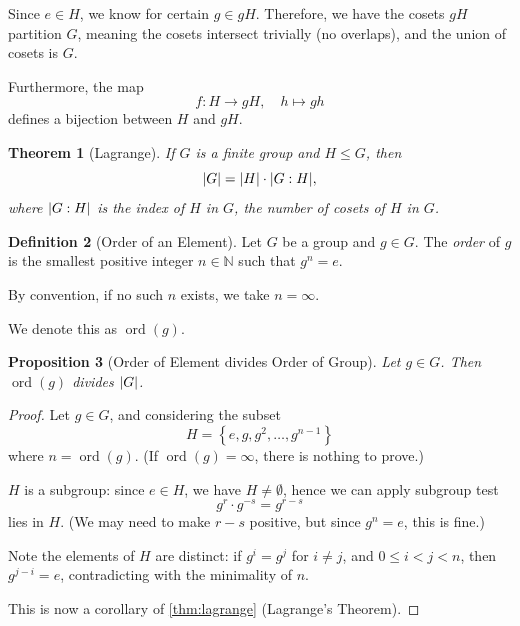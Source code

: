 \documentclass{article}
\newtheorem{theorem}{Theorem}[section]
\newtheorem{proposition}[theorem]{Proposition}
\theoremstyle{definition}
\newtheorem{definition}[theorem]{Definition}
\theoremstyle{remark}
\DeclarePairedDelimiter{\abs}{\lvert}{\rvert}
\newcommand{\pqty}[1]{\left(#1\right)}
\newcommand{\Bqty}[1]{\left\{#1\right\}}
\newcommand{\function}[5]{#1:#2\to #3,\quad #4\mapsto #5}
\newcommand{\subgroup}{\leq}
\newcommand{\NN}{\mathbb{N}}
\newcommand{\ord}{\operatorname{ord}}
\begin{document}
Since \(e \in H\), we know for certain \(g \in gH\). Therefore, we have the cosets \(gH\) partition \(G\), meaning the cosets intersect trivially (no overlaps), and the union of cosets is \(G\).

Furthermore, the map
\[
    \function{f}{H}{gH}{h}{gh}
\]
defines a bijection between \(H\) and \(gH\).

\begin{theorem}[Lagrange]
    \label{thm:lagrange}%
    If \(G\) is a finite group and \(H \subgroup G\), then
    \[
        \abs{G} = \abs{H} \cdot \abs{G : H},
    \]
    where \(\abs{G : H}\) is the \emph{index of \(H\) in \(G\)}, the number of cosets of \(H\) in \(G\).
\end{theorem}

\begin{definition}[Order of an Element]
    \label{def:order-of-element}%
    Let \(G\) be a group and \(g \in G\). The \emph{order} of \(g\) is the smallest positive integer \(n \in \NN\) such that \(g^n = e\).

    By convention, if no such \(n\) exists, we take \(n = \infty\).

    We denote this as \(\ord\pqty{g}\).
\end{definition}

\begin{proposition}[Order of Element divides Order of Group]
    \label{prop:order-of-element-divides-order-of-group}%
    Let \(g \in G\). Then \(\ord\pqty{g}\) divides \(\abs{G}\).
\end{proposition}

\begin{proof}
    Let \(g \in G\), and considering the subset
    \[
        H = \Bqty{e, g, g^2, \ldots, g^{n - 1}}
    \]
    where \(n = \ord\pqty{g}\). (If \(\ord\pqty{g} = \infty\), there is nothing to prove.)

    \(H\) is a subgroup: since \(e \in H\), we have \(H \neq \emptyset\), hence we can apply subgroup test
    \[
        g^r \cdot g^{-s} = g^{r - s}
    \]
    lies in \(H\). (We may need to make \(r - s\) positive, but since \(g^n = e\), this is fine.)

    Note the elements of \(H\) are distinct: if \(g^{i} = g^{j}\) for \(i \neq j\), and \(0 \leq i < j < n\), then \(g^{j - i} = e\), contradicting with the minimality of \(n\).

    This is now a corollary of \autoref{thm:lagrange} (Lagrange's Theorem).
\end{proof}
\end{document}

